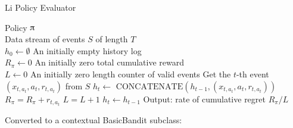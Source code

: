 \documentclass[nojss]{jss}\usepackage[]{graphicx}\usepackage[]{color}
\begin{document}
\begin{algorithm}[H]
\caption{Li Policy Evaluator}
\label{Alg:LiBandit}
\begin{algorithmic}
\REQUIRE  Policy $\piup$ \\
                 Data stream of events $S$ of length $T$  \\
                 $h_0 \leftarrow \emptyset$ {An initially empty history log}\\
                 $R_\pi \leftarrow 0$ {An initially zero total cumulative reward}\\
                 $L \leftarrow 0$ {An initially zero length counter of valid events}
	\STATE Get the $t$-th event \( (x_{t,a_t},a_{t},r_{t,a_t}) \) from  $S$
	       \STATE $h_{t} \leftarrow $  \(\textrm{CONCATENATE}\left( h_{t-1},(x_{t,a_t},a_{t},r_{t,a_t})  \right)\)
	       \STATE $R_\pi = R_\pi + r_{t,a_t}$
	       \STATE $L = L + 1$
	\ELSE
	        \STATE $h_{t} \leftarrow  h_{t-1} $
	\ENDIF
\ENDFOR
\STATE Output: rate of cumulative regret $R_\pi / L $
\end{algorithmic}
\end{algorithm}

Converted to a contextual BasicBandit subclass:
\end{document}

